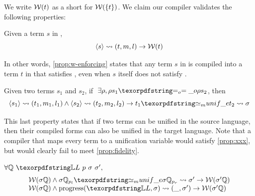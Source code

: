 \noindent
We write $\mathcal{W}(t)$ as a short for $\mathcal{W}(\{t\})$.
We claim our compiler validates the following properties: 

\begin{proposition}\label{prop:w-enforcing}
  Given a term $s$ in \Fo{}, 
  $$
    \langle s \rangle\rightsquigarrow(t,m,l) \to \mathcal{W}(t)
  $$
\end{proposition}

In other words, \cref{prop:w-enforcing} states that any term $s$ in \Fo is
compiled into a term $t$ in \Ho that satisfies \wellb, even when $s$ itself
does not satisfy \wellb.

\begin{proposition}\label{prop:xxx}\label{prop:compilation-w}
  Given two terms $s_1$ and $s_2$, if $\;\exists \rho, \rho s_1 \Eo \rho s_2$,
  then 
  $$
    \C{s_1}{t_1}{m_1}{l_1} \land \C{s_2}{t_2}{m_2}{l_2} \to
    t_1 \Ue t_2 \arr \sigma 
  $$
\end{proposition}


\noindent
This last property states that if two terms can be unified in the source language,
then their compiled forms can also be unified in the target language. Note that
a compiler that maps every term to a unification variable would satisfy
\cref{prop:xxx}, but would clearly fail to meet \cref{prop:fidelity}.

\begin{proposition}\label{prop:w-preservation}
$\forall \hoUnifPb\ \linkStore\ p\ \sigma\ \sigma',$
$$
\begin{array}{l}
\wellb(\sigma\hoUnifPb) \land
  \sigma\hoUnifPb_{p_l} \Ue \sigma\hoUnifPb_{p_r} \arr {\sigma'}
  \to \wellb(\sigma' \hoUnifPb)\\
\wellb(\sigma\hoUnifPb) \land
  \progress(\linkStore,\sigma) \arr (\_,\sigma')
  \to \wellb(\sigma' \hoUnifPb)
\end{array}
$$
\end{proposition}

